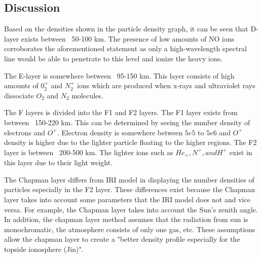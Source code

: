 \subsection{Discussion}
		Based on the densities shown in the particle density graph, it can be seen that D-layer exists between ~50-100 km. The presence of low amounts of NO ions corroborates the aforementioned statement as only a high-wavelength spectral line would be able to penetrate to this level and ionize the heavy ions. 
		\par
		The E-layer is somewhere between ~95-150 km. This layer consists of high amounts of $0_2^+$ and $N_2^+$ ions which are produced when x-rays and ultraviolet rays dissociate $O_2$ and $N_2$ molecules.
		\par
		The F layers is divided into the F1 and F2 layers. The F1 layer exists from between ~150-220 km. This can be determined by seeing the number density of electrons and $O^+$. Electron density is somewhere between $5e5$ to $5e6$ and $O^+$ density is higher due to the lighter particle floating to the higher regions. The F2 layer is between ~200-500 km. The lighter ions such as $He_+, N^+, and H^+$  exist in this layer due to their light weight.
		\par
		The Chapman layer differs from IRI model in displaying the number densities of particles especially in the F2 layer. These differences exist because the Chapman layer takes into account some parameters that the IRI model does not and vice versa. For example, the Chapman layer takes into account the Sun's zenith angle. In addition, the chapman layer method assumes that the radiation from sun is monochromatic, the atmosphere consists of only one gas, etc. These assumptions allow the chapman layer to create a "better density profile especially for the topside ionosphere (Jin)".






%
%
%
%

